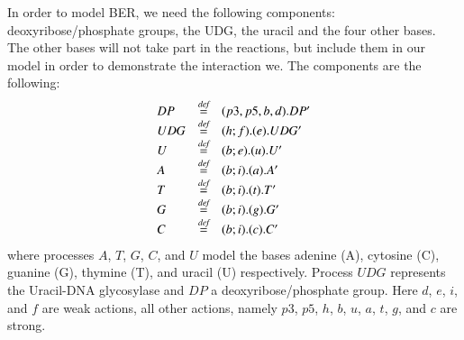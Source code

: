 \documentclass[review]{elsarticle}
\newcommand{\bydef}{\stackrel{\emph{def}}{=}}
\begin{document}
In order to model BER, we need the following components: deoxyribose/phosphate groups, the UDG, the uracil and the four other bases. The other bases will not take part in the reactions, but include them in our model in order to demonstrate the interaction we. The components are the following:
%
$$\begin{array}{lll}
DP & \bydef & (p3,p5,b,d).DP'\\
UDG & \bydef & (h;f).(e).UDG'\\
U & \bydef & (b;e).(u).U'\\
A & \bydef & (b;i).(a).A'\\
T & \bydef & (b;i).(t).T'\\
G & \bydef & (b;i).(g).G'\\
C & \bydef & (b;i).(c).C'\\
\end{array}$$
%
where processes $A$, $T$, $G$, $C$, and $U$ model the bases adenine (A), cytosine (C), guanine (G), thymine (T), and uracil (U) respectively. Process $UDG$ represents the Uracil-DNA glycosylase and $DP$ a deoxyribose/phosphate group. Here $d$, $e$, $i$, and $f$ are weak actions, all other actions, namely $p3$, $p5$, $h$, $b$, $u$, $a$, $t$, $g$, and $c$ are strong.
\end{document}

